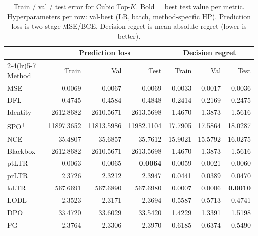 \begin{table}[t]
\centering
\caption[Train/val/test error for Cubic Top-$K$.]{Train / val / test error for Cubic Top-$K$. Bold = best test value per metric. Hyperparameters per row: val-best (LR, batch, method-specific HP). Prediction loss is two-stage MSE/BCE. Decision regret is mean absolute regret (lower is better).}
\label{tab:err-cubic}
\setlength{\tabcolsep}{4pt}
\renewcommand{\arraystretch}{1.05}
\begin{tabular}{@{}lrrrrrr@{}}
\toprule
& \multicolumn{3}{c}{Prediction loss} & \multicolumn{3}{c}{Decision regret} \\
\cmidrule(lr){2-4}\cmidrule(lr){5-7}
Method & Train & Val & Test & Train & Val & Test \\
\midrule
MSE & 0.0069 & 0.0067 & 0.0069 & 0.0033 & 0.0017 & 0.0036 \\
DFL & 0.4745 & 0.4584 & 0.4848 & 0.2414 & 0.2169 & 0.2475 \\
Identity & 2612.8682 & 2610.5671 & 2613.5698 & 1.4670 & 1.3873 & 1.5616 \\
SPO\textsuperscript{+} & 11897.3652 & 11813.5986 & 11982.1104 & 17.7905 & 17.5864 & 18.0287 \\
NCE & 35.4807 & 35.6857 & 35.7612 & 15.9021 & 15.5792 & 16.0275 \\
Blackbox & 2612.8682 & 2610.5671 & 2613.5698 & 1.4670 & 1.3873 & 1.5616 \\
ptLTR & 0.0063 & 0.0065 & \textbf{0.0064} & 0.0059 & 0.0021 & 0.0060 \\
prLTR & 2.3726 & 2.3212 & 2.3947 & 0.0441 & 0.0389 & 0.0470 \\
lsLTR & 567.6691 & 567.6890 & 567.6980 & 0.0007 & 0.0006 & \textbf{0.0010} \\
LODL & 2.3523 & 2.3171 & 2.3694 & 0.5587 & 0.5713 & 0.4741 \\
DPO & 33.4720 & 33.6029 & 33.5420 & 1.4229 & 1.3391 & 1.5198 \\
PG & 2.3764 & 2.3306 & 2.3970 & 0.6185 & 0.6374 & 0.5490 \\
\bottomrule
\end{tabular}
\end{table}

